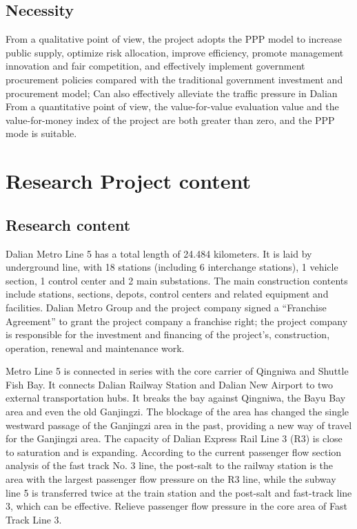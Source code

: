 \documentclass[12pt]{article}
\begin{document}
\subsection{Necessity}

From a qualitative point of view, the project adopts the PPP model to increase public supply, optimize risk allocation, improve efficiency, promote management innovation and fair competition, and effectively implement government procurement policies compared with the traditional government investment and procurement model; Can also effectively alleviate the traffic pressure in Dalian
From a quantitative point of view, the value-for-value evaluation value and the value-for-money index of the project are both greater than zero, and the PPP mode is suitable.


\section{Research Project content}
\subsection{Research content}
Dalian Metro Line 5 has a total length of 24.484 kilometers. It is laid by underground line, with 18 stations (including 6 interchange stations), 1 vehicle section, 1 control center and 2 main substations. The main construction contents include stations, sections, depots, control centers and related equipment and facilities. Dalian Metro Group and the project company signed a “Franchise Agreement” to grant the project company a franchise right; the project company is responsible for the investment and financing of the project’s, construction, operation, renewal and maintenance work.
\par Metro Line 5 is connected in series with the core carrier of Qingniwa and Shuttle Fish Bay. It connects Dalian Railway Station and Dalian New Airport to two external transportation hubs. It breaks the bay against Qingniwa, the Bayu Bay area and even the old Ganjingzi. The blockage of the area has changed the single westward passage of the Ganjingzi area in the past, providing a new way of travel for the Ganjingzi area. The capacity of Dalian Express Rail Line 3 (R3) is close to saturation and is expanding. According to the current passenger flow section analysis of the fast track No. 3 line, the post-salt to the railway station is the area with the largest passenger flow pressure on the R3 line, while the subway line 5 is transferred twice at the train station and the post-salt and fast-track line 3, which can be effective. Relieve passenger flow pressure in the core area of Fast Track Line 3.
\end{document}
